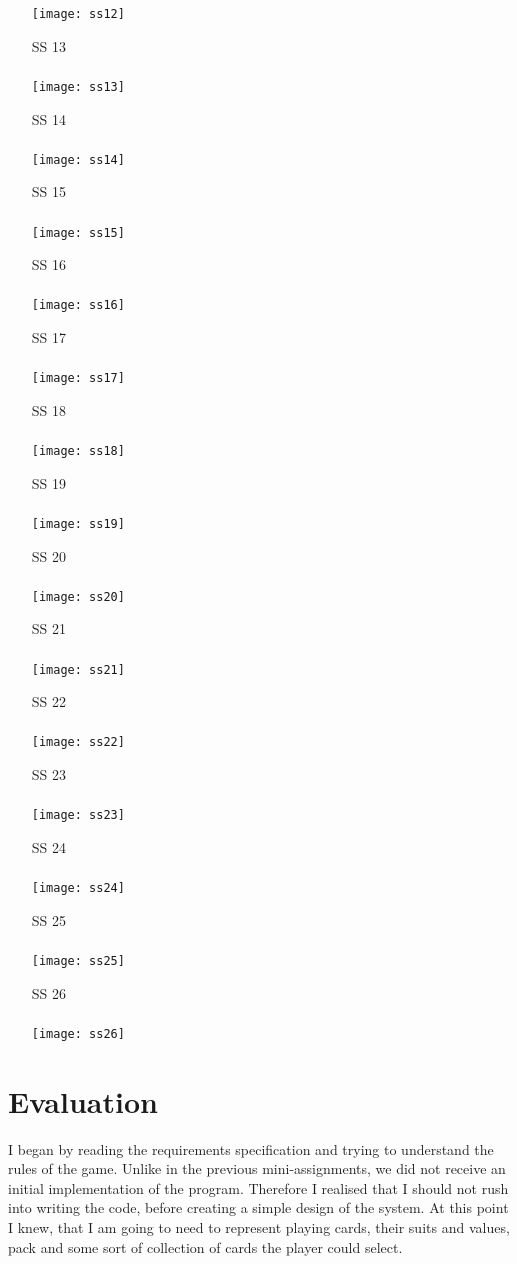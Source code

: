 \documentclass[a4paper, 11pt, titlepage]{article}
\begin{document}
\begin{enumerate}
		\texttt{[image: ss12]} \newpage
	\item[SS]13\\\\ 
		\texttt{[image: ss13]}
	\item[SS]14\\\\ 
		\texttt{[image: ss14]} \newpage
	\item[SS]15\\\\ 
		\texttt{[image: ss15]}
	\item[SS]16\\\\ 
		\texttt{[image: ss16]} \newpage
	\item[SS]17\\\\ 
		\texttt{[image: ss17]}
	\item[SS]18\\\\ 
		\texttt{[image: ss18]} \newpage
	\item[SS]19\\\\ 
		\texttt{[image: ss19]}
	\item[SS]20\\\\ 
		\texttt{[image: ss20]} \newpage
	\item[SS]21\\\\ 
		\texttt{[image: ss21]}
	\item[SS]22\\\\ 
		\texttt{[image: ss22]} \newpage
	\item[SS]23\\\\ 
		\texttt{[image: ss23]}
	\item[SS]24\\\\ 
		\texttt{[image: ss24]} \newpage
	\item[SS]25\\\\ 
		\texttt{[image: ss25]}
	\item[SS]26\\\\ 
		\texttt{[image: ss26]}		
\end{enumerate}
\section{Evaluation}
I began by reading the requirements specification and trying to understand the rules
of the game. Unlike in the previous mini-assignments, we did not receive an initial 
implementation of the program. Therefore I realised that I should not rush into 
writing the code, before creating a simple design of the system. At this point I knew,
that I am going to need to represent playing cards, their suits and values, pack and 
some sort of collection of cards the player could select. 
\end{document}
